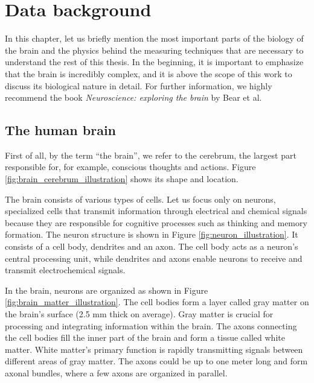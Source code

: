 \chapter{Data background}\label{brain}

In this chapter, let us briefly mention the most important parts of the biology of the brain and the physics behind the measuring techniques that are necessary to understand the rest of this thesis. In the beginning, it is important to emphasize that the brain is incredibly complex, and it is above the scope of this work to discuss its biological nature in detail. For further information, we highly recommend the book \textit{Neuroscience: exploring the brain} by Bear et al. \cite{bear_neuroscience_2016}

\section{The human brain}

First of all, by the term \enquote{the brain}, we refer to the cerebrum, the largest part responsible for, for example, conscious thoughts and actions. Figure \ref{fig:brain_cerebrum_illustration} shows its shape and location.



The brain consists of various types of cells. Let us focus only on neurons, specialized cells that transmit information through electrical and chemical signals because they are responsible for cognitive processes such as thinking and memory formation. The neuron structure is shown in Figure \ref{fig:neuron_illustration}. It consists of a cell body, dendrites and an axon. The cell body acts as a neuron's central processing unit, while dendrites and axons enable neurons to receive and transmit electrochemical signals. 

In the brain, neurons are organized as shown in Figure \ref{fig:brain_matter_illustration}. The cell bodies form a layer called gray matter on the brain's surface (2.5 mm thick on average). Gray matter is crucial for processing and integrating information within the brain. The axons connecting the cell bodies fill the inner part of the brain and form a tissue called white matter. White matter's primary function is rapidly transmitting signals between different areas of gray matter. The axons could be up to one meter long and form axonal bundles, where a few axons are organized in parallel. \cite{bear_neuroscience_2016}

